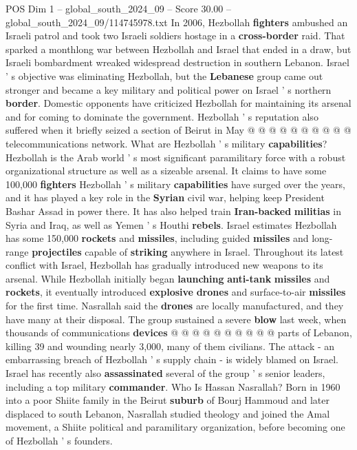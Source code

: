 \begin{textsample}{POS Dim 1 – global\_south\_2024\_09 – Score 30.00 – global\_south\_2024\_09/114745978.txt}
In 2006, Hezbollah \textbf{fighters} ambushed an Israeli patrol and took two Israeli soldiers hostage in a \textbf{cross-border} raid.
That sparked a monthlong war between Hezbollah and Israel that ended in a draw, but Israeli bombardment wreaked widespread destruction in southern Lebanon.
Israel ' s objective was eliminating Hezbollah, but the \textbf{Lebanese} group came out stronger and became a key military and political power on Israel ' s northern \textbf{border}.
Domestic opponents have criticized Hezbollah for maintaining its arsenal and for coming to dominate the government.
Hezbollah ' s reputation also suffered when it briefly seized a section of Beirut in May @ @ @ @ @ @ @ @ @ @ telecommunications network.
What are Hezbollah ' s military \textbf{capabilities}?
Hezbollah is the Arab world ' s most significant paramilitary force with a robust organizational structure as well as a sizeable arsenal.
It claims to have some 100,000 \textbf{fighters} Hezbollah ' s military \textbf{capabilities} have surged over the years, and it has played a key role in the \textbf{Syrian} civil war, helping keep President Bashar Assad in power there.
It has also helped train \textbf{Iran-backed} \textbf{militias} in Syria and Iraq, as well as Yemen ' s Houthi \textbf{rebels}.
Israel estimates Hezbollah has some 150,000 \textbf{rockets} and \textbf{missiles}, including guided \textbf{missiles} and long-range \textbf{projectiles} capable of \textbf{striking} anywhere in Israel.
Throughout its latest conflict with Israel, Hezbollah has gradually introduced new weapons to its arsenal.
While Hezbollah initially began \textbf{launching} \textbf{anti-tank} \textbf{missiles} and \textbf{rockets}, it eventually introduced \textbf{explosive} \textbf{drones} and surface-to-air \textbf{missiles} for the first time.
Nasrallah said the \textbf{drones} are locally manufactured, and they have many at their disposal.
The group sustained a severe \textbf{blow} last week, when thousands of communications \textbf{devices} @ @ @ @ @ @ @ @ @ @ parts of Lebanon, killing 39 and wounding nearly 3,000, many of them civilians.
The attack - an embarrassing breach of Hezbollah ' s supply chain - is widely blamed on Israel.
Israel has recently also \textbf{assassinated} several of the group ' s senior leaders, including a top military \textbf{commander}.
Who Is Hassan Nasrallah?
Born in 1960 into a poor Shiite family in the Beirut \textbf{suburb} of Bourj Hammoud and later displaced to south Lebanon, Nasrallah studied theology and joined the Amal movement, a Shiite political and paramilitary organization, before becoming one of Hezbollah ' s founders.

\end{textsample}
